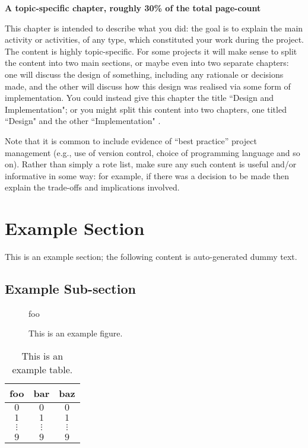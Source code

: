 
{\bf A topic-specific chapter, roughly 30\% of the total page-count}
\vspace{1cm} 

\noindent
This chapter is intended to describe what you did: the goal is to explain
the main activity or activities, of any type, which constituted your work 
during the project.  The content is highly topic-specific. For some 
projects it will make sense to split the content into two main sections, or maybe even into two separate chapters: one 
will discuss the design of something, including any rationale or decisions made, 
and the other will discuss how this design was realised via some form of 
implementation.  You could instead give this chapter the title ``Design and Implementation"; or you might split this content into two chapters, one titled ``Design" and the other ``Implementation" .

Note that it is common to include evidence of ``best practice'' project 
management (e.g., use of version control, choice of programming language 
and so on).  Rather than simply a rote list, make sure any such content 
is useful and/or informative in some way: for example, if there was a 
decision to be made then explain the trade-offs and implications 
involved.

\section{Example Section}

	This is an example section; 
	the following content is auto-generated dummy text.
	\lipsum
	
	\subsection{Example Sub-section}
	
		\begin{figure}[t]
			\centering
			foo
			\caption{This is an example figure.}
			\label{fig}
		\end{figure}
		
		\begin{table}[t]
			\centering
			\begin{tabular}{|cc|c|}
				\hline
				foo      & bar      & baz      \\
				\hline
				$0     $ & $0     $ & $0     $ \\
				$1     $ & $1     $ & $1     $ \\
				$\vdots$ & $\vdots$ & $\vdots$ \\
				$9     $ & $9     $ & $9     $ \\
				\hline
			\end{tabular}
			\caption{This is an example table.}
			\label{tab}
		\end{table}
		
